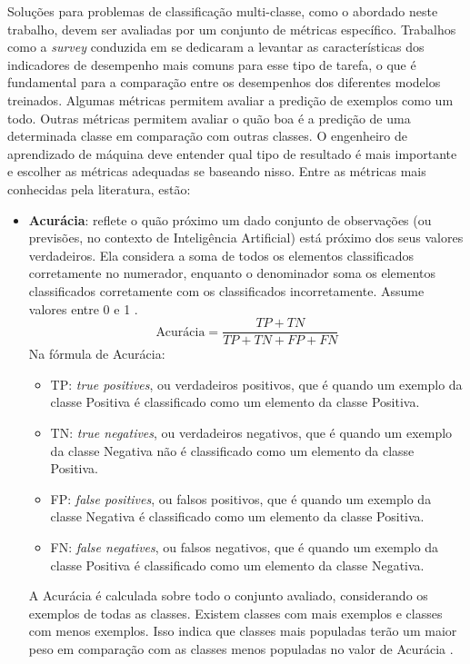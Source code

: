 Soluções para problemas de classificação multi-classe, como o abordado neste trabalho, devem ser avaliadas por um conjunto de métricas específico. Trabalhos como a \textit{survey} conduzida em \cite{metrics_survey} se dedicaram a levantar as características dos indicadores de desempenho mais comuns para esse tipo de tarefa, o que é fundamental para a comparação entre os desempenhos dos diferentes modelos treinados. Algumas métricas permitem avaliar a predição de exemplos como um todo. Outras métricas permitem avaliar o quão boa é a predição de uma determinada classe em comparação com outras classes. O engenheiro de aprendizado de máquina deve entender qual tipo de resultado é mais importante e escolher as métricas adequadas se baseando nisso. Entre as métricas mais conhecidas pela literatura, estão:

\begin{itemize}
    \item \textbf{Acurácia}: reflete o quão próximo um dado conjunto de observações (ou previsões, no contexto de Inteligência Artificial) está próximo dos seus valores verdadeiros. Ela considera a soma de todos os elementos classificados corretamente no numerador, enquanto o denominador soma os elementos classificados corretamente com os classificados incorretamente. Assume valores entre 0 e 1 \cite{metrics_survey}.
    \begin{equation}\label{eq_accuracy}
        \text{Acurácia} = \dfrac{TP + TN}{TP + TN + FP + FN}
    \end{equation}
    Na fórmula de Acurácia:
        \begin{itemize}
            \item TP: \textit{true positives}, ou verdadeiros positivos, que é quando um exemplo da classe Positiva é classificado como um elemento da classe Positiva.
            \item TN: \textit{true negatives}, ou verdadeiros negativos, que é quando um exemplo da classe Negativa não é classificado como um elemento da classe Positiva.
            \item FP: \textit{false positives}, ou falsos positivos, que é quando um exemplo da classe Negativa é classificado como um elemento da classe Positiva.
            \item FN: \textit{false negatives}, ou falsos negativos, que é quando um exemplo da classe Positiva é classificado como um elemento da classe Negativa.
        \end{itemize}
    A Acurácia é calculada sobre todo o conjunto avaliado, considerando os exemplos de todas as classes. Existem classes com mais exemplos e classes com menos exemplos. Isso indica que classes mais populadas terão um maior peso em comparação com as classes menos populadas no valor de Acurácia \cite{metrics_survey}.

\end{itemize}
